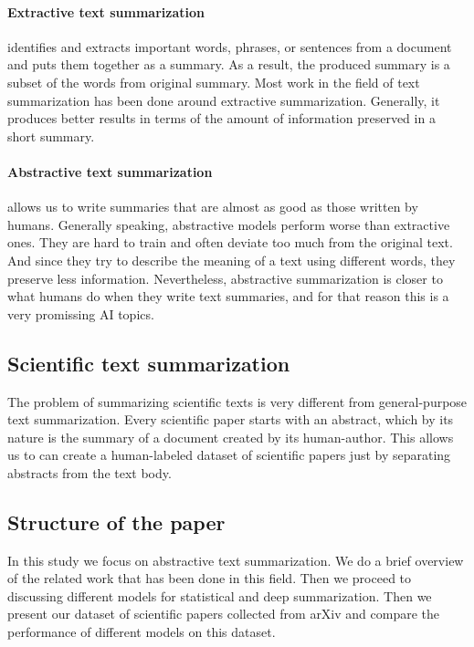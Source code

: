 \documentclass[sigplan]{acmart}
\begin{document}
\paragraph{Extractive text summarization} identifies and extracts important words, phrases, or sentences from a document and puts them together as a summary. As a result, the produced summary is a subset of the words from original summary\cite{kumar-16}. Most work in the field of text summarization has been done around extractive summarization. Generally, it produces better results in terms of the amount of information preserved in a short summary. 

\paragraph{Abstractive text summarization} allows us to write summaries that are almost as good as those written by humans. Generally speaking, abstractive models perform worse than extractive ones. They are hard to train and often deviate too much from the original text. And since they try to describe the meaning of a text using different words, they preserve less information. Nevertheless, abstractive summarization is closer to what humans do when they write text summaries, and for that reason this is a very promissing AI topics.

\subsection{Scientific text summarization}

The problem of summarizing scientific texts is very different from general-purpose text summarization. Every scientific paper starts with an abstract, which by its nature is the summary of a document created by its human-author. This allows us to can create a human-labeled dataset of scientific papers just by separating abstracts from the text body.

\subsection{Structure of the paper}

In this study we focus on abstractive text summarization. We do a brief overview of the related work that has been done in this field. Then we proceed to discussing different models for statistical and deep summarization. Then we present our dataset of scientific papers collected from arXiv and compare the performance of different models on this dataset. 
\end{document}
